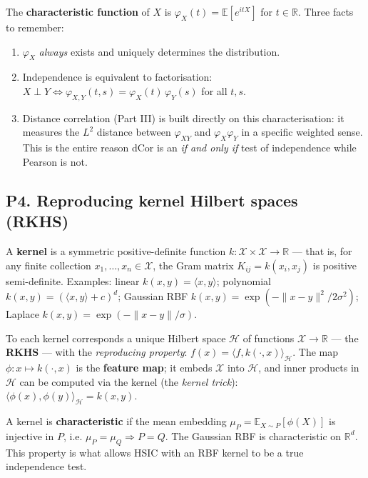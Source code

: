 \documentclass{article}
\providecommand{\tightlist}{\setlength{\itemsep}{0pt}\setlength{\parskip}{0pt}}
\begin{document}
The \textbf{characteristic function} of \(X\) is
\(\varphi_X(t) = \mathbb{E}[e^{itX}]\) for \(t \in \mathbb{R}\). Three
facts to remember:

\begin{enumerate}
\def\labelenumi{\arabic{enumi}.}
\tightlist
\item
  \(\varphi_X\) \emph{always} exists and uniquely determines the
  distribution.
\item
  Independence is equivalent to factorisation:
  \(X \perp Y \iff \varphi_{X, Y}(t, s) = \varphi_X(t)\, \varphi_Y(s)\)
  for all \(t, s\).
\item
  Distance correlation (Part III) is built directly on this
  characterisation: it measures the \(L^2\) distance between
  \(\varphi_{XY}\) and \(\varphi_X \varphi_Y\) in a specific weighted
  sense. This is the entire reason dCor is an \emph{if and only if} test
  of independence while Pearson is not.
\end{enumerate}

\subsection{P4. Reproducing kernel Hilbert spaces
(RKHS)}\label{p4-reproducing-kernel-hilbert-spaces-rkhs}

A \textbf{kernel} is a symmetric positive-definite function
\(k: \mathcal{X} \times \mathcal{X} \to \mathbb{R}\) --- that is, for
any finite collection \(x_1, \dots, x_n \in \mathcal{X}\), the Gram
matrix \(K_{ij} = k(x_i, x_j)\) is positive semi-definite. Examples:
linear \(k(x, y) = \langle x, y \rangle\); polynomial
\(k(x, y) = (\langle x, y \rangle + c)^d\); Gaussian RBF
\(k(x, y) = \exp(-\|x - y\|^2 / 2\sigma^2)\); Laplace
\(k(x, y) = \exp(-\|x - y\|/\sigma)\).

To each kernel corresponds a unique Hilbert space \(\mathcal{H}\) of
functions \(\mathcal{X} \to \mathbb{R}\) --- the \textbf{RKHS} --- with
the \emph{reproducing property}:
\(f(x) = \langle f, k(\cdot, x) \rangle_\mathcal{H}\). The map
\(\phi: x \mapsto k(\cdot, x)\) is the \textbf{feature map}; it embeds
\(\mathcal{X}\) into \(\mathcal{H}\), and inner products in
\(\mathcal{H}\) can be computed via the kernel (the \emph{kernel
trick}): \(\langle \phi(x), \phi(y) \rangle_\mathcal{H} = k(x, y)\).

A kernel is \textbf{characteristic} if the mean embedding
\(\mu_P = \mathbb{E}_{X \sim P}[\phi(X)]\) is injective in \(P\), i.e.
\(\mu_P = \mu_Q \Rightarrow P = Q\). The Gaussian RBF is characteristic
on \(\mathbb{R}^d\). This property is what allows HSIC with an RBF
kernel to be a true independence test.
\end{document}
